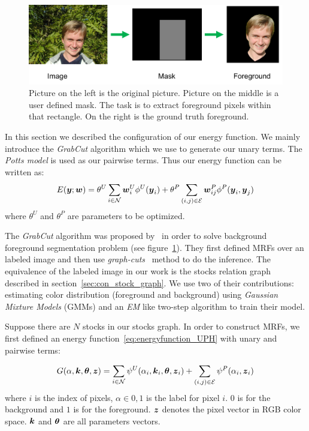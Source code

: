 \begin{figure}[b]
  \centering
  \includegraphics[width=1\linewidth]{RelatedWorks/figures/grabcut_task.png}
  \caption{\label{fig:grabcut_example} Picture on the left is
    the original picture. Picture
    on the middle is a user defined mask. The task is to extract
    foreground pixels within that rectangle. On the right is the
    ground truth foreground.}
\end{figure}

In this section we described the configuration of our energy
function. We mainly introduce the \emph{GrabCut} algorithm which
we use to generate our unary terms. The \emph{Potts model} is
used as our pairwise terms. Thus our energy function can be
written as:
\begin{align}
  \label{eq:energyfunction_UP}
  E(\by;\bw)=\theta^U\sum_{i\in \N}{\bw_i^U\phi^U(\by_i)}+
  \theta^P\sum_{(i,j)\in \E}{\bw_{ij}^P\phi^P(\by_i,\by_j)}
\end{align}
\noindent where $\theta^U$ and $\theta^P$ are parameters to be
optimized.

The \emph{GrabCut} algorithm was proposed
by~ in order to solve background
foreground segmentation problem (see
figure~\ref{fig:grabcut_example}). They first defined MRFs over
an labeled image and then use
\emph{graph-cuts}~\cite{Boykov:ICCV01} method to do the
inference. The equivalence of the labeled image in our work is
the stocks relation graph described in
section~\ref{sec:con_stock_graph}. We use two of their
contributions: estimating color distribution (foreground and
background) using \emph{Gaussian Mixture Models} (GMMs) and an
\emph{EM} like two-step algorithm to train their model.

Suppose there are $N$ stocks in our stocks graph. In order to
construct MRFs, we first defined an energy
function~\eqref{eq:energyfunction_UPH} with unary and pairwise
terms:

\begin{align}
  \label{eq:grabcut_energy}
  G(\alpha, \bk, \btheta, \bz) = 
  \sum_{i\in \N}{\psi^U(\alpha_i, \bk_i, \btheta, \bz_i)}+
  \sum_{(i,j)\in \E}{\psi^P(\alpha_i,\bz_i)}
\end{align}
where $i$ is the index of pixels, $\alpha \in {0,1}$ is the label
for pixel $i$. $0$ is for the background and $1$ is for the
foreground. ${\boldsymbol{z}}$ denotes the pixel vector in RGB color space.
${\boldsymbol{k}}$ and $\boldsymbol{\theta}$ are all parameters vectors.

